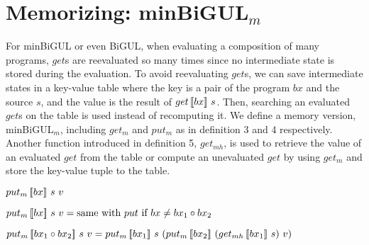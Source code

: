 \section{Memorizing: minBiGUL$_m$}

For minBiGUL or even BiGUL, when evaluating a composition of many programs, $get$s are reevaluated so many times since no intermediate state is stored during the evaluation. To avoid reevaluating $get$s, we can save intermediate states in a key-value table where the key is a pair of the program $bx$ and the source $s$, and the value is the result of $get \, [\![bx]\!] \ s$. Then, searching an evaluated $get$s on the table is used instead of recomputing it. We define a memory version, minBiGUL$_m$, including $get_m$ and $put_m$ as in definition 3 and 4 respectively. Another function introduced in definition 5, $get_{mh}$, is used to retrieve the value of an evaluated $get$ from the table or compute an unevaluated $get$ by using $get_m$ and store the key-value tuple to the table.

\begin{definition} $put_m \, [\![bx]\!] \ s \ v$

    $put_m \, [\![bx]\!] \ s \ v = \text{same with } put \text{ if } bx \neq bx_1 \circ bx_2$

    $\putm{bx_1 \circ bx_2}{s}{v} = \putm{bx_1}{s}{(\putm{bx_2}{(\getmh{bx_1}{s})}{v})}$
\end{definition}

